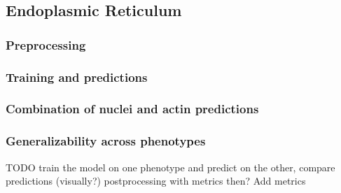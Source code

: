 \subsection{Endoplasmic Reticulum}
    \subsubsection{Preprocessing}
        
    \subsubsection{Training and predictions}
        
    \subsubsection{Combination of nuclei and actin predictions}
        
    \subsubsection{Generalizability across phenotypes}
        TODO train the model on one phenotype and predict on the other, compare predictions (visually?) 
        postprocessing with metrics then?
        Add metrics
